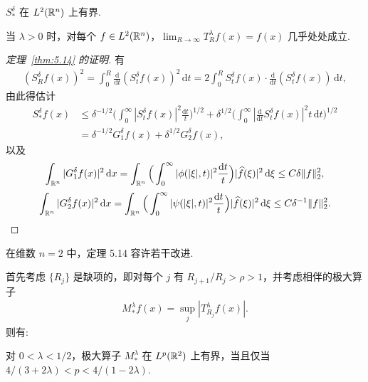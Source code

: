 \begin{theorem}\label{thm:5.14}
$S_{*}^{\delta}$ 在 $L^2(\mathbb{R}^n)$ 上有界.
\end{theorem}

\begin{corollary}\label{cor:5.15}
当 $\lambda > 0$ 时，对每个 $f \in L^2(\mathbb{R}^n)$，$\lim_{R \to \infty} T_R^\lambda f(x) = f(x)$ 几乎处处成立.
\end{corollary}

\begin{proof}[定理~\ref{thm:5.14} 的证明]
有
\begin{align*}
  (S_{R}^{\delta}f(x))^{2}
  =\int_{0}^{R}\frac{\mathrm{d}}{\mathrm{d}t}(S_{t}^{\delta}f(x))^{2}\,\mathrm{d}t
  =2\int_{0}^{R}S_{t}^{\delta}f(x)\cdot\frac{\mathrm{d}}{\mathrm{d}t}(S_{t}^{\delta}f(x))\,\mathrm{d}t,
\end{align*}
由此得估计
\begin{align*}
  S_{*}^{\delta}f(x)
  &\leq\delta^{-1/2}\Big(\int_{0}^{\infty}\left|S_{t}^{\delta}f(x)\right|^{2}\frac{\mathrm{d}t}{t}\Big)^{1/2}
   +\delta^{1/2}\Big(\int_{0}^{\infty}\left|\frac{\mathrm{d}}{\mathrm{d}t}S_{t}^{\delta}f(x)\right|^{2}t\,\mathrm{d}t\Big)^{1/2}\\
  &=\delta^{-1/2}G_{1}^{\delta}f(x)+\delta^{1/2}G_{2}^{\delta}f(x),
\end{align*}
以及
\begin{align*}
  \int_{\mathbb{R}^{n}}|G_{1}^{\delta}f(x)|^{2}\,\mathrm{d}x
  =\int_{\mathbb{R}^{n}}\Big(\int_{0}^{\infty}|\phi(|\xi|,t)|^{2}\frac{\mathrm{d}t}{t}\Big)|\widehat{f}(\xi)|^{2}\,\mathrm{d}\xi
  \leq C\delta\|f\|_{2}^{2},
\end{align*}
\begin{align*}
  \int_{\mathbb{R}^{n}}|G_{2}^{\delta}f(x)|^{2}\,\mathrm{d}x
  =\int_{\mathbb{R}^{n}}\Big(\int_{0}^{\infty}|\psi(|\xi|,t)|^{2}\frac{\mathrm{d}t}{t}\Big)|\widehat{f}(\xi)|^{2}\,\mathrm{d}\xi
  \leq C\delta^{-1}\|f\|_{2}^{2}.
\end{align*}
\end{proof}

在维数 $n = 2$ 中，定理 5.14 容许若干改进.

首先考虑 $\{R_j\}$ 是缺项的，即对每个 $j$ 有 $R_{j+1}/R_j > \rho > 1$，并考虑相伴的极大算子
\begin{align*}
  M_{*}^{\lambda}f(x)=\sup_{j}|T_{R_{j}}^{\lambda}f(x)|.
\end{align*}
则有:

\begin{theorem}\label{thm:5.16}
对 $0 < \lambda < 1/2$，极大算子 $M_{*}^{\lambda}$ 在 $L^p(\mathbb{R}^2)$ 上有界，当且仅当 $4/(3+2\lambda) < p < 4/(1-2\lambda)$.
\end{theorem}

